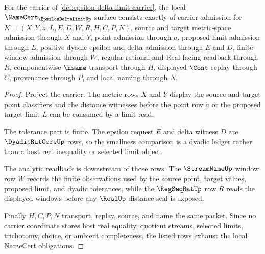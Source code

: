 \begin{theorem}
\label{thm:epsilon-delta-limit-namecert-obligations}
For the carrier of \autoref{def:epsilon-delta-limit-carrier}, the local $\NameCert_{\EpsilonDeltaLimitUp}$ surface consists exactly of carrier admission for $K=(X,Y,a,L,E,D,W,R,H,C,P,N)$, source and target metric-space admission through $X$ and $Y$, point admission through $a$, proposed-limit admission through $L$, positive dyadic epsilon and delta admission through $E$ and $D$, finite-window admission through $W$, regular-rational and Real-facing readback through $R$, componentwise $\hsame$ transport through $H$, displayed $\Cont$ replay through $C$, provenance through $P$, and local naming through $N$.
\end{theorem}
\begin{proof}
Project the carrier. The metric rows $X$ and $Y$ display the source and target point classifiers and the distance witnesses before the point row $a$ or the proposed target limit $L$ can be consumed by a limit read.

The tolerance part is finite. The epsilon request $E$ and delta witness $D$ are $\DyadicRatCoreUp$ rows, so the smallness comparison is a dyadic ledger rather than a host real inequality or selected limit object.

The analytic readback is downstream of those rows. The $\StreamNameUp$ window row $W$ records the finite observations used by the source point, target values, proposed limit, and dyadic tolerances, while the $\RegSeqRatUp$ row $R$ reads the displayed windows before any $\RealUp$ distance seal is exposed.

Finally $H,C,P,N$ transport, replay, source, and name the same packet. Since no carrier coordinate stores host real equality, quotient streams, selected limits, trichotomy, choice, or ambient completeness, the listed rows exhaust the local NameCert obligations.
\end{proof}

